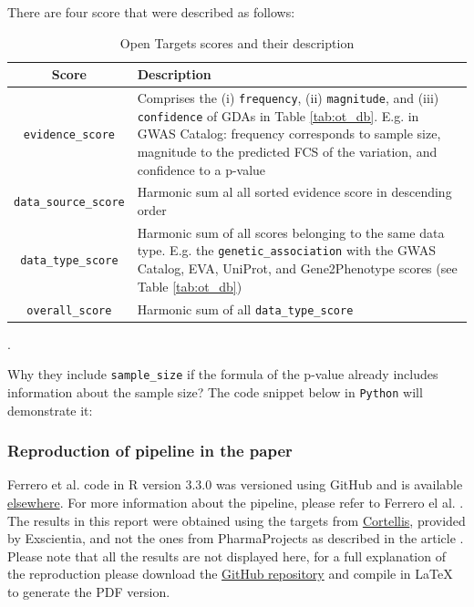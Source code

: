 There are four score that were described as follows:

\begin{table}[H]
\centering
    \begin{tabular}{c|p{12cm}}
      Score & Description \\ \hline
      
      \texttt{evidence\_score} & Comprises the (i) \texttt{frequency}, (ii) \texttt{magnitude}, and (iii) \texttt{confidence} of GDAs \cite{koscielny2016} in Table \ref{tab:ot_db}. E.g. in GWAS Catalog: frequency corresponds to sample size, magnitude to the predicted FCS of the variation, and confidence to a p-value \\ \hline
      
      \texttt{data\_source\_score} & Harmonic sum al all sorted evidence score in descending order \\ \hline
      
      \texttt{data\_type\_score} & Harmonic sum of all scores belonging to the same data type. E.g. the  \texttt{genetic\_association} with the GWAS Catalog, EVA, UniProt, and Gene2Phenotype scores (see Table \ref{tab:ot_db}) \\ \hline
      
      \texttt{overall\_score} & Harmonic sum of all \texttt{data\_type\_score} \\ 
      
      \end{tabular}
\caption{Open Targets scores and their description \label{tab:ot_scores}}.
\end{table}

Why they include \texttt{sample\_size} if the formula of the p-value already includes information about the sample size? The code snippet below in \texttt{Python} will demonstrate it:


\subsubsection{Reproduction of pipeline in the paper}
Ferrero et al. code in R version 3.3.0 was versioned using GitHub and is available \href{https://goo.gl/C4cSgQ}{elsewhere}. For more information about the pipeline, please refer to Ferrero el al. \cite{ferrero2017}. The results in this report were obtained using the targets from \href{https://www.cortellis.com}{Cortellis}, provided by Exscientia, and not the ones from PharmaProjects as described in the article \cite{ferrero2017}. Please note that all the results are not displayed here, for a full explanation of the reproduction please download the \href{https://github.com/davidnarganes/iCASErep}{GitHub repository} and compile in LaTeX to generate the PDF version.

